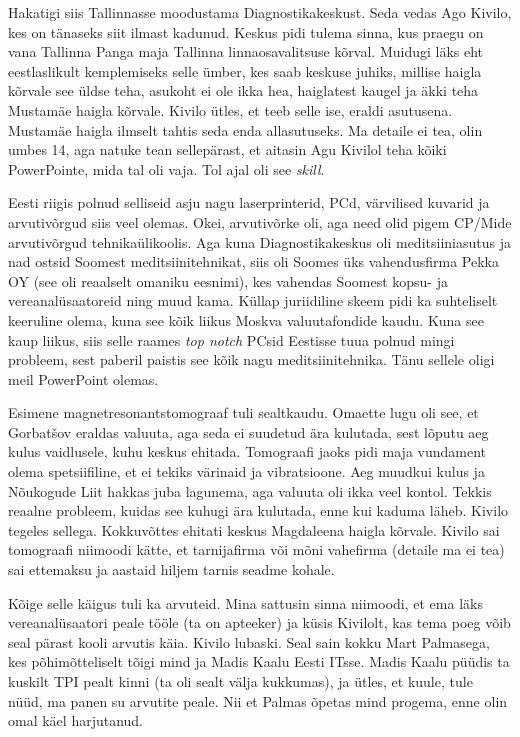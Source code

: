 Hakatigi siis Tallinnasse moodustama 
Diagnostikakeskust. Seda vedas Ago Kivilo, kes on tänaseks siit ilmast kadunud. Keskus pidi tulema 
sinna, kus praegu on vana Tallinna Panga maja Tallinna linnaosavalitsuse 
kõrval. Muidugi läks eht eestlaslikult kemplemiseks selle ümber, kes 
saab keskuse juhiks, millise haigla kõrvale see üldse teha, asukoht ei ole 
ikka hea, haiglatest kaugel ja äkki teha Mustamäe haigla kõrvale. 
Kivilo ütles, et teeb selle ise, eraldi asutusena. Mustamäe haigla 
ilmselt tahtis seda enda allasutuseks. Ma detaile ei tea, 
olin umbes 14, aga natuke tean sellepärast, et 
aitasin Agu Kivilol teha kõiki PowerPointe, mida tal oli vaja. Tol ajal oli
see \emph{skill}. 


Eesti riigis polnud selliseid 
asju nagu laserprinterid, PCd, värvilised kuvarid ja arvutivõrgud siis veel olemas. Okei, arvutivõrke oli, aga need olid pigem 
CP/Mide arvutivõrgud tehnikaülikoolis. Aga kuna 
Diagnostikakeskus oli meditsiiniasutus ja nad ostsid Soomest 
meditsiinitehnikat, siis oli Soomes üks vahendusfirma
Pekka OY (see oli reaalselt omaniku eesnimi), kes vahendas 
Soomest kopsu- ja vereanalüsaatoreid ning muud kama. Küllap juriidiline skeem pidi ka suhteliselt keeruline olema, kuna see kõik liikus 
Moskva valuutafondide kaudu. Kuna see kaup liikus, 
siis selle raames \emph{top notch} PCsid Eestisse tuua polnud mingi probleem, 
sest paberil paistis see kõik nagu meditsiinitehnika. Tänu sellele oligi meil PowerPoint olemas.


Esimene magnetresonantstomograaf tuli sealtkaudu. Omaette lugu oli see, et Gorbatšov eraldas valuuta, aga seda ei suudetud ära kulutada, sest lõputu aeg 
kulus vaidlusele, kuhu keskus ehitada. Tomograafi jaoks pidi maja vundament olema spetsiifiline, et ei tekiks
värinaid ja vibratsioone. Aeg muudkui kulus ja Nõukogude Liit hakkas juba lagunema, 
aga valuuta oli ikka veel kontol. Tekkis reaalne probleem, kuidas see 
kuhugi ära kulutada, enne kui kaduma läheb. 
Kivilo tegeles sellega. Kokkuvõttes ehitati keskus Magdaleena 
haigla kõrvale. Kivilo sai tomograafi niimoodi kätte, et 
tarnijafirma või mõni vahefirma (detaile ma ei tea) sai 
ettemaksu ja aastaid hiljem tarnis seadme kohale. 

Kõige selle käigus tuli ka arvuteid. Mina 
sattusin sinna niimoodi, et ema läks vereanalüsaatori peale tööle (ta on apteeker) ja küsis Kivilolt, kas tema poeg võib seal pärast kooli
arvutis käia. Kivilo lubaski. Seal sain 
kokku Mart Palmasega, kes 
põhimõtteliselt tõigi mind ja Madis Kaalu Eesti ITsse. Madis Kaalu püüdis ta kuskilt TPI pealt kinni (ta oli sealt 
välja kukkumas), ja ütles, et kuule, tule nüüd, ma panen su arvutite 
peale. Nii et Palmas õpetas mind progema, enne olin omal käel 
harjutanud. 

